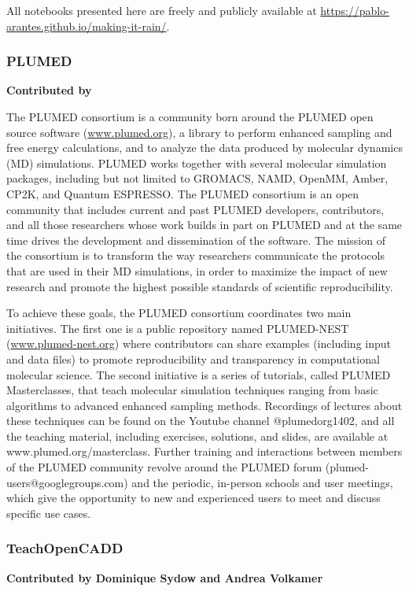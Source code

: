 \documentclass[9pt,review]{livecoms}
\begin{document}
All notebooks presented here are freely and publicly available at  \url{https://pablo-arantes.github.io/making-it-rain/}.

\subsubsection{PLUMED}

\textbf{Contributed by }

The PLUMED consortium\cite{plumed2019promoting} is a community born around the PLUMED open source software (\href{https://www.plumed.org}{www.plumed.org})\cite{tribello2014plumed}, a library to perform enhanced sampling and free energy calculations, and to analyze the data produced by molecular dynamics (MD) simulations. PLUMED works together with several molecular simulation packages, including but not limited to GROMACS, NAMD, OpenMM, Amber, CP2K, and Quantum ESPRESSO. The PLUMED consortium  is an open community that includes current and past PLUMED developers, contributors, and all those researchers whose work builds in part on PLUMED and at the same time drives the development and dissemination of the software. The mission of the consortium is to transform the way researchers communicate the protocols that are used in their MD simulations, in order to maximize the impact of new research and promote the highest possible standards of scientific reproducibility. 

To achieve these goals, the PLUMED consortium coordinates two main initiatives. The first one is a public repository named PLUMED-NEST (\href{https://www.plumed-nest.org}{www.plumed-nest.org}) where contributors can share examples (including input and data files) to promote reproducibility and transparency in computational molecular science. The second initiative is a series of tutorials, called PLUMED Masterclasses, that teach molecular simulation techniques ranging from basic algorithms to advanced enhanced sampling methods. Recordings of lectures about these techniques can be found on the Youtube channel @plumedorg1402, and all the teaching material, including exercises, solutions, and slides, are available at www.plumed.org/masterclass. Further training and interactions between members of the PLUMED community revolve around the PLUMED forum (plumed-users@googlegroups.com) and the periodic, in-person schools and user meetings, which give the opportunity to new and experienced users to meet and discuss specific use cases.

\subsubsection{TeachOpenCADD}
\textbf{Contributed by Dominique Sydow and Andrea Volkamer}
\end{document}
